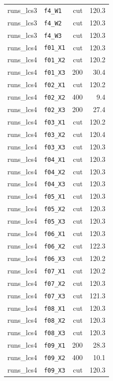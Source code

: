 \begin{longtable}{@{}llrr@{}}
runs\_lcs3 & \texttt{f4\_W1} & cut & 120.3 \\
runs\_lcs3 & \texttt{f4\_W2} & cut & 120.3 \\
runs\_lcs3 & \texttt{f4\_W3} & cut & 120.3 \\
runs\_lcs4 & \texttt{f01\_X1} & cut & 120.3 \\
runs\_lcs4 & \texttt{f01\_X2} & cut & 120.2 \\
runs\_lcs4 & \texttt{f01\_X3} & 200 & 30.4 \\
runs\_lcs4 & \texttt{f02\_X1} & cut & 120.2 \\
runs\_lcs4 & \texttt{f02\_X2} & 400 & 9.4 \\
runs\_lcs4 & \texttt{f02\_X3} & 200 & 27.4 \\
runs\_lcs4 & \texttt{f03\_X1} & cut & 120.2 \\
runs\_lcs4 & \texttt{f03\_X2} & cut & 120.4 \\
runs\_lcs4 & \texttt{f03\_X3} & cut & 120.3 \\
runs\_lcs4 & \texttt{f04\_X1} & cut & 120.3 \\
runs\_lcs4 & \texttt{f04\_X2} & cut & 120.3 \\
runs\_lcs4 & \texttt{f04\_X3} & cut & 120.3 \\
runs\_lcs4 & \texttt{f05\_X1} & cut & 120.3 \\
runs\_lcs4 & \texttt{f05\_X2} & cut & 120.3 \\
runs\_lcs4 & \texttt{f05\_X3} & cut & 120.3 \\
runs\_lcs4 & \texttt{f06\_X1} & cut & 120.3 \\
runs\_lcs4 & \texttt{f06\_X2} & cut & 122.3 \\
runs\_lcs4 & \texttt{f06\_X3} & cut & 120.2 \\
runs\_lcs4 & \texttt{f07\_X1} & cut & 120.2 \\
runs\_lcs4 & \texttt{f07\_X2} & cut & 120.3 \\
runs\_lcs4 & \texttt{f07\_X3} & cut & 121.3 \\
runs\_lcs4 & \texttt{f08\_X1} & cut & 120.3 \\
runs\_lcs4 & \texttt{f08\_X2} & cut & 120.3 \\
runs\_lcs4 & \texttt{f08\_X3} & cut & 120.3 \\
runs\_lcs4 & \texttt{f09\_X1} & 200 & 28.3 \\
runs\_lcs4 & \texttt{f09\_X2} & 400 & 10.1 \\
runs\_lcs4 & \texttt{f09\_X3} & cut & 120.3 \\

\end{longtable}
